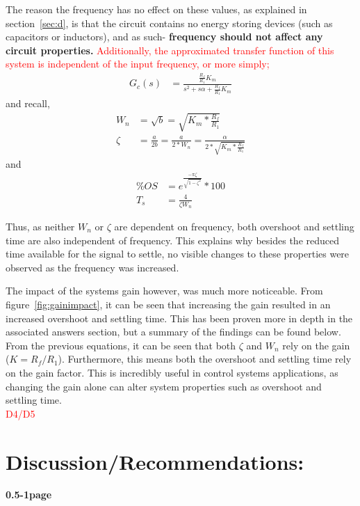 \documentclass[11pt,a4paper]{article}
\begin{document}
The reason the frequency has no effect on these values, as explained in section~\ref{sec:d}, is that the circuit contains no energy storing devices (such as capacitors or inductors), and as such- \textbf{frequency should not affect any circuit properties.} \textcolor{red}{Additionally, the approximated transfer function of this system is independent of the input frequency, or more simply;}
\begin{align*}
G_c(s) &= \frac{\frac{R_f}{R_1}K_m} {s^2 + s\alpha + \frac{R_f}{R_1}K_m}
\end{align*}
and recall, 
\begin{align*}
W_n &= \sqrt{b} = \sqrt{K_m * \frac{R_f}{R_1}} \\
\zeta &= \frac{a}{2b} = \frac{a}{2*W_n} = \frac{\alpha}{2*\sqrt{K_m * \frac{R_f}{R_1}}}
\end{align*}
and
\begin{align*}
\%OS &= e^{\frac{-\pi \zeta}{\sqrt{1-\zeta^2}}} * 100 \\
T_s &= \frac{4}{\zeta W_n}
\end{align*}

Thus, as neither $W_n$ or $\zeta$ are dependent on frequency, both overshoot and settling time are also independent of frequency. 
This explains why besides the reduced time available for the signal to settle, no visible changes to these properties were observed as the frequency was increased. 

The impact of the systems gain however, was much more noticeable. From figure~\ref{fig:gainimpact}, it can be seen that increasing the gain resulted in an increased overshoot and settling time. This has been proven more in depth in the associated answers section, but a summary of the findings can be found below.  \\
From the previous equations, it can be seen that both $\zeta$ and $W_n$ rely on the gain ($K = R_f/R_1$). Furthermore, this means both the overshoot and settling time rely on the gain factor. This is incredibly useful in control systems applications, as changing the gain alone can alter system properties such as overshoot and settling time.\\
\textcolor{red}{D4/D5}



\pagebreak
\section{Discussion/Recommendations:}
\textbf{0.5-1page}\\
\end{document}
